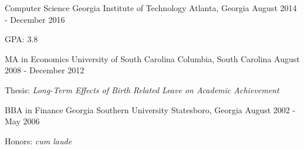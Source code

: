 

\begin{cventries}

  \cventry
    {Computer Science} %
    {Georgia Institute of Technology} %
    {Atlanta, Georgia} %
    {August 2014 - December 2016} %
    {
      \begin{cvitems} %
        \item {GPA: 3.8}
      \end{cvitems}
    }
    
    \cventry
    {MA in Economics} %
    {University of South Carolina} %
    {Columbia, South Carolina} %
    {August 2008 - December 2012} %
    {
      \begin{cvitems} %
        \item {Thesis: \textit{Long-Term Effects of Birth Related Leave on Academic Achievement}}
      \end{cvitems}
    }
    
    \cventry
    {BBA in Finance} %
    {Georgia Southern University} %
    {Statesboro, Georgia} %
    {August 2002 - May 2006} %
    {
      \begin{cvitems} %
        \item {Honors: \textit{cum laude}}
      \end{cvitems}
    }

\end{cventries}
